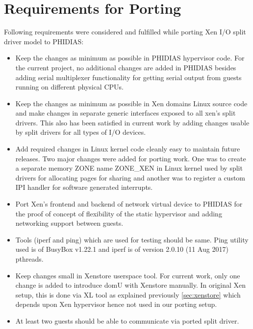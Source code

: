 \section{Requirements for Porting\label{sec:xen}}
Following requirements were considered and fulfilled while porting Xen I/O split driver model to PHIDIAS:
\begin{itemize}
	\item Keep the changes as minimum as possible in PHIDIAS hypervisor code. For the current project, no additional changes are added in PHIDIAS besides adding serial multiplexer functionality for getting serial output from guests running on different physical CPUs.
	\item Keep the changes as minimum as possible in Xen domains Linux source code and make changes in separate generic interfaces exposed to all xen's split drivers. This also has been satisfied in current work by adding changes usable by split drivers for all types of I/O devices.
	\item Add required changes in Linux kernel code cleanly easy to maintain future releases. Two major changes were added for porting work. One was to create a separate memory ZONE name ZONE\_XEN in Linux kernel used by split drivers for allocating pages for sharing and another was to register a custom IPI handler for software generated interrupts.
	\item Port Xen's frontend and backend of network virtual device to PHIDIAS for the proof of concept of flexibility of the static hypervisor and adding networking support between guests.
	\item Tools (iperf and ping) which are used for testing should be same. Ping utility used is of BusyBox v1.22.1 and iperf is of version 2.0.10 (11 Aug 2017) pthreads.
	\item Keep changes small in Xenstore userspace tool. For current work, only one change is added to introduce domU with Xenstore manually. In original Xen setup, this is done via XL tool as explained previously \ref{sec:xenstore}  which depends upon Xen hypervisor hence not used in our porting setup.
	\item At least two guests should be able to communicate via ported split driver.
\end{itemize}

